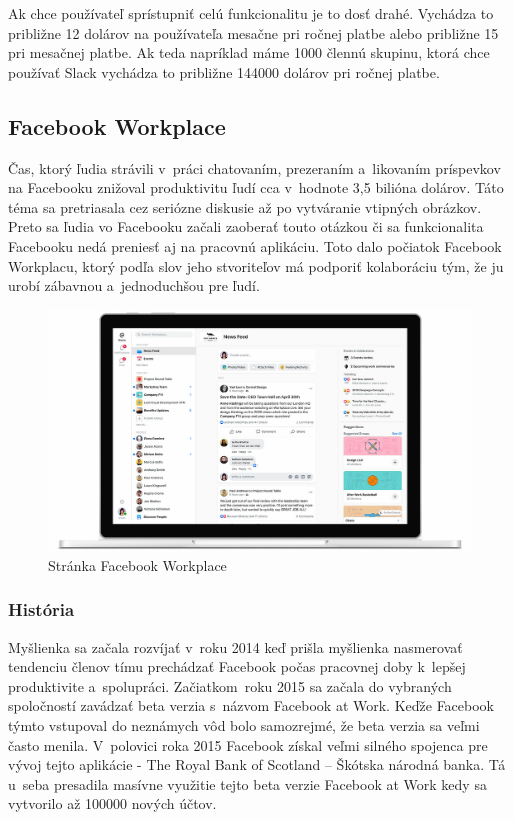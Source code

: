 \indent Ak chce používateľ sprístupniť celú funkcionalitu je to dosť drahé. Vychádza to približne 12 dolárov na používateľa mesačne pri ročnej platbe alebo približne 15 pri mesačnej platbe. Ak teda napríklad máme 1000 člennú skupinu, ktorá chce používať Slack vychádza to približne 144000 dolárov pri ročnej platbe.

\subsection{Facebook Workplace}
\indent Čas, ktorý ľudia strávili v práci chatovaním, prezeraním a likovaním príspevkov na Facebooku znižoval produktivitu ľudí cca v hodnote 3,5 bilióna dolárov. Táto téma sa pretriasala cez seriózne diskusie až po vytváranie vtipných obrázkov. Preto sa ľudia vo Facebooku začali zaoberať touto otázkou či sa funkcionalita Facebooku nedá preniesť aj na pracovnú aplikáciu. Toto dalo počiatok Facebook Workplacu, ktorý podľa slov jeho stvoriteľov má podporiť kolaboráciu tým, že ju urobí zábavnou a jednoduchšou pre ľudí.

\begin{figure}[H]
    \centering
    \includegraphics[scale=0.25]{img/obr-fb-workplace.jpg}
    \caption{Stránka Facebook Workplace}
    \label{fig:img-fb-workplace}
\end{figure}

\subsubsection{História}
\indent Myšlienka sa začala rozvíjať v roku 2014 keď prišla myšlienka nasmerovať tendenciu členov tímu prechádzať Facebook počas pracovnej doby k lepšej produktivite a spolupráci. Začiatkom roku 2015 sa začala do vybraných spoločností zavádzať beta verzia s názvom Facebook at Work. Keďže Facebook týmto vstupoval do neznámych vôd bolo samozrejmé, že beta verzia sa veľmi často menila. V polovici roka 2015 Facebook získal veľmi silného spojenca pre vývoj tejto aplikácie - The Royal Bank of Scotland – Škótska národná banka. Tá u seba presadila masívne využitie tejto beta verzie Facebook at Work kedy sa vytvorilo až 100000 nových účtov. 

